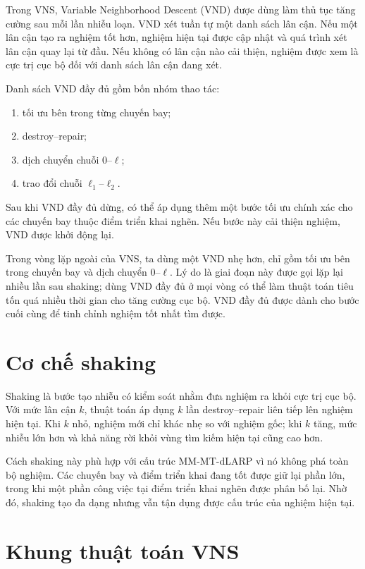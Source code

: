 Trong VNS, Variable Neighborhood Descent (VND) được dùng làm thủ tục tăng cường sau mỗi lần nhiễu loạn. VND xét tuần tự một danh sách lân cận. Nếu một lân cận tạo ra nghiệm tốt hơn, nghiệm hiện tại được cập nhật và quá trình xét lân cận quay lại từ đầu. Nếu không có lân cận nào cải thiện, nghiệm được xem là cực trị cục bộ đối với danh sách lân cận đang xét.

Danh sách VND đầy đủ gồm bốn nhóm thao tác:
\begin{enumerate}[label=(\roman*), leftmargin=1.2cm]
    \item tối ưu bên trong từng chuyến bay;
    \item destroy--repair;
    \item dịch chuyển chuỗi \(0\)--\(\ell\);
    \item trao đổi chuỗi \(\ell_1\)--\(\ell_2\).
\end{enumerate}

Sau khi VND đầy đủ dừng, có thể áp dụng thêm một bước tối ưu chính xác cho các chuyến bay thuộc điểm triển khai nghẽn. Nếu bước này cải thiện nghiệm, VND được khởi động lại.

Trong vòng lặp ngoài của VNS, ta dùng một VND nhẹ hơn, chỉ gồm tối ưu bên trong chuyến bay và dịch chuyển \(0\)--\(\ell\). Lý do là giai đoạn này được gọi lặp lại nhiều lần sau shaking; dùng VND đầy đủ ở mọi vòng có thể làm thuật toán tiêu tốn quá nhiều thời gian cho tăng cường cục bộ. VND đầy đủ được dành cho bước cuối cùng để tinh chỉnh nghiệm tốt nhất tìm được.

\section{Cơ chế shaking}
\label{sec:vns-shaking}

Shaking là bước tạo nhiễu có kiểm soát nhằm đưa nghiệm ra khỏi cực trị cục bộ. Với mức lân cận \(k\), thuật toán áp dụng \(k\) lần destroy--repair liên tiếp lên nghiệm hiện tại. Khi \(k\) nhỏ, nghiệm mới chỉ khác nhẹ so với nghiệm gốc; khi \(k\) tăng, mức nhiễu lớn hơn và khả năng rời khỏi vùng tìm kiếm hiện tại cũng cao hơn.

Cách shaking này phù hợp với cấu trúc MM-MT-dLARP vì nó không phá toàn bộ nghiệm. Các chuyến bay và điểm triển khai đang tốt được giữ lại phần lớn, trong khi một phần công việc tại điểm triển khai nghẽn được phân bố lại. Nhờ đó, shaking tạo đa dạng nhưng vẫn tận dụng được cấu trúc của nghiệm hiện tại.

\section{Khung thuật toán VNS}
\label{sec:vns-algorithm}

